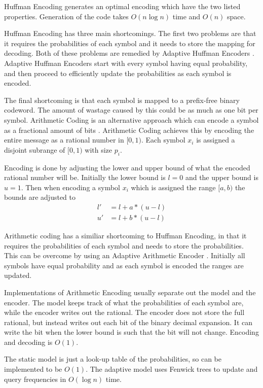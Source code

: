 \documentclass{report}
\begin{document}
Huffman Encoding generates an optimal encoding which have the two listed
properties. Generation of the code takes $O(n \log n)$ time and $O(n)$ space.

Huffman Encoding has three main shortcomings. The first two problems are that
it requires the probabilities of each symbol and it needs to store the mapping
for decoding. Both of these problems are remedied by Adaptive Huffman Encoders
\citep{drozdek,vitter1987}. Adaptive Huffman Encoders start with every symbol
having equal probability, and then proceed to efficiently update the
probabilities as each symbol is encoded.

The final shortcoming is that each symbol is mapped to a prefix-free binary
codeword. The amount of wastage caused by this could be as much as one bit per
symbol. Arithmetic Coding is an alternative approach which can encode a symbol
as a fractional amount of bits \citep{drozdek}. Arithmetic Coding achieves
this by encoding the entire message as a rational number in $[0,1)$. Each
  symbol $x_i$ is assigned a disjoint subrange of $[0,1)$ with size $p_i$.

Encoding is done by adjusting the lower and upper bound of what the encoded
rational number will be. Initially the lower bound is $l=0$ and the upper
bound is $u=1$. Then when encoding a symbol $x_i$ which is assigned the range
$[a,b)$ the bounds are adjusted to
\begin{align*}
  l' & = l + a * (u-l) \\
  u' & = l + b * (u-l)
\end{align*}

Arithmetic coding has a similiar shortcoming to Huffman Encoding, in that it
requires the probabilities of each symbol and needs to store the
probabilities. This can be overcome by using an Adaptive Arithmetic Encoder
\citep{drozdek}. Initially all symbols have equal probability and as each
symbol is encoded the ranges are updated.

Implementations of Arithmetic Encoding usually separate out the model and the
encoder. The model keeps track of what the probabilities of each symbol are,
while the encoder writes out the rational. The encoder does not store the full
rational, but instead writes out each bit of the binary decimal expansion. It
can write the bit when the lower bound is such that the bit will not
change. Encoding and decoding is $O(1)$.

The static model is just a look-up table of the probabilities, so can be
implemented to be $O(1)$. The adaptive model uses Fenwick trees to update and
query frequencies in $O(\log n)$ time.
\end{document}
